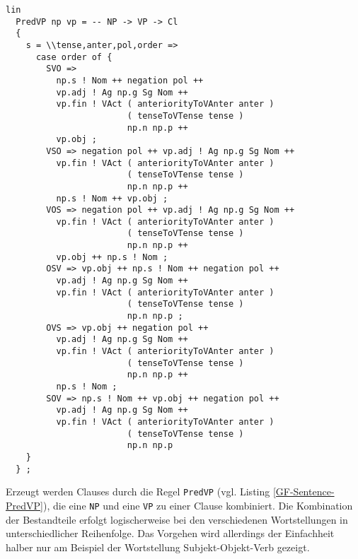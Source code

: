 \begin{lstlisting}[float=h!tp,caption={Syntaxregel \texttt{PredVP} um eine \texttt{NP} und eine \texttt{VP} zu einer \texttt{Cl} zu kombinieren (vgl. \textbf{SentenceLat.gf})},basicstyle=\small,label={GF-Sentence-PredVP}]
lin
  PredVP np vp = -- NP -> VP -> Cl
  {
    s = \\tense,anter,pol,order => 
      case order of {
        SVO => 
          np.s ! Nom ++ negation pol ++ 
          vp.adj ! Ag np.g Sg Nom ++ 
          vp.fin ! VAct ( anteriorityToVAnter anter )
                        ( tenseToVTense tense ) 
                        np.n np.p ++
          vp.obj ;
        VSO => negation pol ++ vp.adj ! Ag np.g Sg Nom ++ 
          vp.fin ! VAct ( anteriorityToVAnter anter ) 
                        ( tenseToVTense tense ) 
                        np.n np.p ++ 
          np.s ! Nom ++ vp.obj ;
        VOS => negation pol ++ vp.adj ! Ag np.g Sg Nom ++ 
          vp.fin ! VAct ( anteriorityToVAnter anter ) 
                        ( tenseToVTense tense ) 
                        np.n np.p ++ 
          vp.obj ++ np.s ! Nom ;
        OSV => vp.obj ++ np.s ! Nom ++ negation pol ++ 
          vp.adj ! Ag np.g Sg Nom ++ 
          vp.fin ! VAct ( anteriorityToVAnter anter ) 
                        ( tenseToVTense tense ) 
                        np.n np.p ;
        OVS => vp.obj ++ negation pol ++ 
          vp.adj ! Ag np.g Sg Nom ++
          vp.fin ! VAct ( anteriorityToVAnter anter ) 
                        ( tenseToVTense tense ) 
                        np.n np.p ++ 
          np.s ! Nom ;
        SOV => np.s ! Nom ++ vp.obj ++ negation pol ++ 
          vp.adj ! Ag np.g Sg Nom ++ 
          vp.fin ! VAct ( anteriorityToVAnter anter ) 
                        ( tenseToVTense tense ) 
                        np.n np.p 
    }
  } ;
\end{lstlisting}
Erzeugt werden Clauses durch die Regel \texttt{PredVP} (vgl. Listing \ref{GF-Sentence-PredVP}), die eine \texttt{NP} und eine \texttt{VP} zu einer Clause kombiniert. Die Kombination der Bestandteile erfolgt logischerweise bei den verschiedenen Wortstellungen in unterschiedlicher Reihenfolge. Das Vorgehen wird allerdings der Einfachheit halber nur am Beispiel der Wortstellung Subjekt-Objekt-Verb gezeigt. \par
